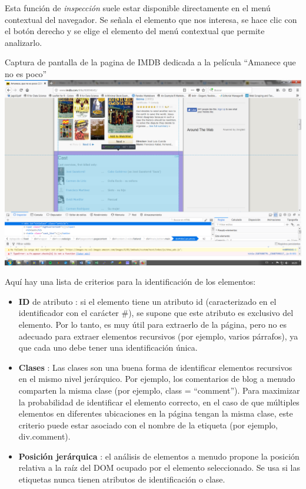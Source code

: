 \documentclass[]{article}
\begin{document}
Esta función de \emph{inspección} suele estar disponible directamente en
el menú contextual del navegador. Se señala el elemento que nos
interesa, se hace clic con el botón derecho y se elige el elemento del
menú contextual que permite analizarlo.

Captura de pantalla de la pagina de IMDB dedicada a la película
``Amanece que no es poco'' \includegraphics{images/amanece.png}

Aquí hay una lista de criterios para la identificación de los elementos:

\begin{itemize}
\item
  \textbf{ID} de atributo : si el elemento tiene un atributo id
  (caracterizado en el identificador con el carácter \#), se supone que
  este atributo es exclusivo del elemento. Por lo tanto, es muy útil
  para extraerlo de la página, pero no es adecuado para extraer
  elementos recursivos (por ejemplo, varios párrafos), ya que cada uno
  debe tener una identificación única.
\item
  \textbf{Clases} : Las clases son una buena forma de identificar
  elementos recursivos en el mismo nivel jerárquico. Por ejemplo, los
  comentarios de blog a menudo comparten la misma clase (por ejemplo,
  class = ``comment''). Para maximizar la probabilidad de identificar el
  elemento correcto, en el caso de que múltiples elementos en diferentes
  ubicaciones en la página tengan la misma clase, este criterio puede
  estar asociado con el nombre de la etiqueta (por ejemplo,
  div.comment).
\item
  \textbf{Posición jerárquica} : el análisis de elementos a menudo
  propone la posición relativa a la raíz del DOM ocupado por el elemento
  seleccionado. Se usa si las etiquetas nunca tienen atributos de
  identificación o clase.
\end{itemize}
\end{document}
